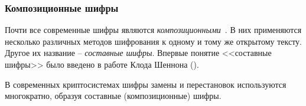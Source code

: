 \subsubsection{Композиционные шифры}

Почти все современные шифры являются \emph{композиционными}~\cite{AlZKCh:2001}. В них применяются несколько различных методов шифрования к одному и тому же открытому тексту. Другое их название -- \emph{составные шифры}. Впервые понятие <<составные шифры>> было введено в работе Клода Шеннона ().

В современных криптосистемах шифры замены и перестановок используются многократно, образуя составные (композиционные) шифры.

